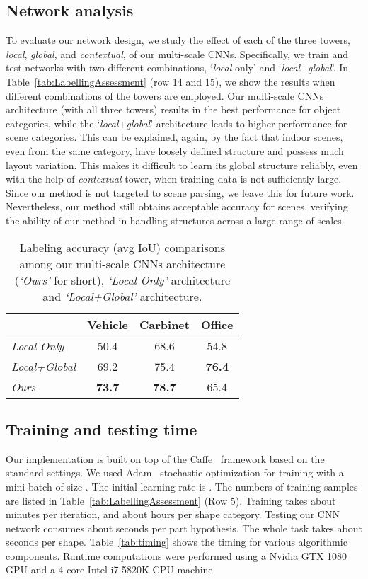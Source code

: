 \documentclass[acmtog]{acmart}
\newcommand{\new}[1]{{\color{black}#1}}
\begin{document}
\subsection{Network analysis}
To evaluate our network design, we study the effect of each of the three towers,
\emph{local}, \emph{global}, and \emph{contextual}, of our multi-scale CNNs.
Specifically, we train and test networks with two different combinations, `\emph{local} only' and `\emph{local}+\emph{global}'.
In Table~\ref{tab:LabellingAssessment} (row 14 and 15), we show the results when different combinations of the towers are employed.
Our multi-scale CNNs architecture (with all three towers) results in the best performance
for object categories,
while the `\emph{local}+\emph{global}' architecture leads to higher performance for scene categories.
This can be explained, again, by the fact that indoor scenes, even from the same category, have loosely defined structure
and possess much layout variation. This makes it difficult to learn its global structure reliably, even
with the help of \emph{contextual} tower, when training data is not sufficiently large.
Since our method is not targeted to scene parsing, we leave this for future work.
Nevertheless, our method still obtains acceptable accuracy for scenes, verifying the ability of our method in
handling structures across a large range of scales.






\begin{table}[!ht]
\caption{Labeling accuracy (avg IoU) comparisons among our multi-scale CNNs architecture (\textsl{`Ours'} for short), \textsl{`Local Only'} architecture and   \textsl{`Local+Global'} architecture.}
\centering
  \begin{tabular}{lccc}
    \hline
      & Vehicle &  Carbinet & Office \\
    \hline
    \textsl{Local Only}   & 50.4 & 68.6 & 54.8 \\
    \textsl{Local+Global} & 69.2 & 75.4 & \textbf{76.4} \\
    \textsl{Ours}         & \textbf{73.7} & \textbf{78.7} & 65.4 \\
    \hline
  \end{tabular}
\label{tab:NetworkAnalysis}
\end{table}
\fi


\subsection{Training and testing time}
\new{
Our implementation is built on top of the Caffe~\citep{Jia_2014} framework based on the standard settings.
We used Adam~\citep{Kingma_2014} stochastic optimization for training with a mini-batch of size .
The initial learning rate is .
The numbers of training samples are listed in Table~\ref{tab:LabellingAssessment} (Row 5).
Training takes about  minutes per  iteration, and about  hours per shape category.
Testing our CNN network consumes about  seconds per part hypothesis.
The whole task takes about  seconds per shape.
Table~\ref{tab:timing} shows the timing for various algorithmic components.
Runtime computations were performed using a Nvidia GTX 1080 GPU and a 4 core Intel i7-5820K CPU machine.}
\end{document}

